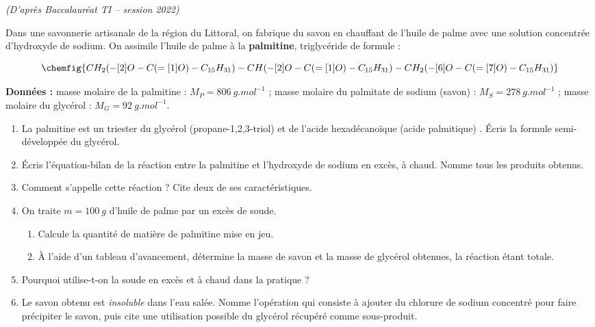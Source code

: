 \documentclass[11pt]{article}
\begin{document}
\begin{exercice}
\textit{(D'après Baccalauréat TI -- session 2022)}

Dans une savonnerie artisanale de la région du Littoral, on fabrique du savon en chauffant de l'huile de palme avec une solution concentrée d'hydroxyde de sodium. On assimile l'huile de palme à la \textbf{palmitine}, triglycéride de formule :

\[ \chemfig{CH_2(-[2]O-C(=[1]O)-C_{15}H_{31})-CH(-[2]O-C(=[1]O)-C_{15}H_{31})-CH_2(-[6]O-C(=[7]O)-C_{15}H_{31})} \]

\textbf{Données :} masse molaire de la palmitine : $M_P = \SI{806}{g.mol^{-1}}$ ; masse molaire du palmitate de sodium (savon)  : $M_S = \SI{278}{g.mol^{-1}}$ ; masse molaire du glycérol : $M_G = \SI{92}{g.mol^{-1}}$.

\begin{enumerate}
\item La palmitine est un triester du glycérol (propane-1,2,3-triol) et de l'acide hexadécanoïque (acide palmitique) . Écris la formule semi-développée du glycérol.
\item Écris l'équation-bilan de la réaction entre la palmitine et l'hydroxyde de sodium en excès, à chaud. Nomme tous les produits obtenus.
\item Comment s'appelle cette réaction ? Cite deux de ses caractéristiques.
\item On traite $m = \SI{100}{g}$ d'huile de palme par un excès de soude.
\begin{enumerate}
\item Calcule la quantité de matière de palmitine mise en jeu.
\item À l'aide d'un tableau d'avancement, détermine la masse de savon et la masse de glycérol obtenues, la réaction étant totale.
\end{enumerate}
\item Pourquoi utilise-t-on la soude en excès et à chaud dans la pratique ?
\item Le savon obtenu est \emph{insoluble} dans l'eau salée. Nomme l'opération qui consiste à ajouter du chlorure de sodium concentré pour faire précipiter le savon, puis cite une utilisation possible du glycérol récupéré comme sous-produit.
\end{enumerate}
\end{exercice}

\newpage
\end{document}
